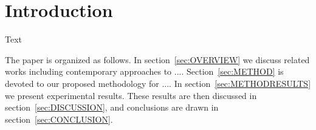 \section{Introduction}\label{sec:INTRO}


Text \cite{jia2014caffe}


The paper is organized as follows.
In section~\ref{sec:OVERVIEW} we discuss related works including contemporary approaches to ....
Section~\ref{sec:METHOD} is devoted to our proposed methodology for ....
In section~\ref{sec:METHODRESULTS} we present experimental results.
These results are then discussed in section~\ref{sec:DISCUSSION},
and conclusions are drawn in section~\ref{sec:CONCLUSION}.
